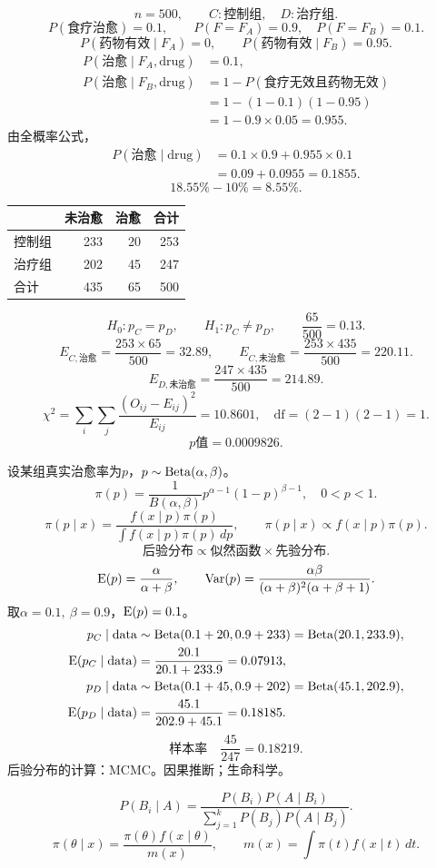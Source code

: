 \[
n=500,\qquad C:\text{控制组},\quad D:\text{治疗组}.
\]
\[
P(\text{食疗治愈})=0.1,\qquad
P(F=F_A)=0.9,\quad P(F=F_B)=0.1.
\]
\[
P(\text{药物有效}\mid F_A)=0,\qquad
P(\text{药物有效}\mid F_B)=0.95.
\]
\begin{align*}
P(\text{治愈}\mid F_A,\mathrm{drug})&=0.1,\\
P(\text{治愈}\mid F_B,\mathrm{drug})
&=1-P(\text{食疗无效且药物无效})\\
&=1-(1-0.1)(1-0.95)\\
&=1-0.9\times0.05=0.955.
\end{align*}
由全概率公式，
\begin{align*}
P(\text{治愈}\mid\mathrm{drug})
&=0.1\times0.9+0.955\times0.1\\
&=0.09+0.0955=0.1855.
\end{align*}
\[
18.55\%-10\%=8.55\%.
\]

\begin{center}
\begin{tabular}{lrrr}\toprule
 &未治愈&治愈&合计\\\midrule
控制组&233&20&253\\
治疗组&202&45&247\\\midrule
合计&435&65&500\\\bottomrule
\end{tabular}
\end{center}
\[
H_0:p_C=p_D,\qquad H_1:p_C\ne p_D,\qquad
\frac{65}{500}=0.13.
\]
\[
E_{C,\text{治愈}}=\frac{253\times65}{500}=32.89,\qquad
E_{C,\text{未治愈}}=\frac{253\times435}{500}=220.11.
\]
\[
E_{D,\text{未治愈}}=\frac{247\times435}{500}=214.89.
\]
\[
\chi^2=\sum_i\sum_j\frac{(O_{ij}-E_{ij})^2}{E_{ij}}
=10.8601,\quad
\mathrm{df}=(2-1)(2-1)=1.
\]
\[
p\text{值}=0.0009826.
\]

设某组真实治愈率为$p$，$p\sim\operatorname{Beta}(\alpha,\beta)$。
\[
\pi(p)=\frac{1}{B(\alpha,\beta)}p^{\alpha-1}(1-p)^{\beta-1},
\quad 0<p<1.
\]
\[
\pi(p\mid x)=
\frac{f(x\mid p)\pi(p)}{\int f(x\mid p)\pi(p)\,dp},
\qquad
\pi(p\mid x)\propto f(x\mid p)\pi(p).
\]
\[
\text{后验分布}\propto\text{似然函数}\times\text{先验分布}.
\]
\[
\operatorname{E}(p)=\frac{\alpha}{\alpha+\beta},\qquad
\operatorname{Var}(p)=\frac{\alpha\beta}{(\alpha+\beta)^2(\alpha+\beta+1)}.
\]
取$\alpha=0.1,\ \beta=0.9$，$\operatorname{E}(p)=0.1$。
\begin{align*}
p_C\mid\mathrm{data}
&\sim\operatorname{Beta}(0.1+20,0.9+233)=\operatorname{Beta}(20.1,233.9),\\
\operatorname{E}(p_C\mid\mathrm{data})
&=\frac{20.1}{20.1+233.9}=0.07913,\\
p_D\mid\mathrm{data}
&\sim\operatorname{Beta}(0.1+45,0.9+202)=\operatorname{Beta}(45.1,202.9),\\
\operatorname{E}(p_D\mid\mathrm{data})
&=\frac{45.1}{202.9+45.1}=0.18185.
\end{align*}
\[
\text{样本率}\quad \frac{45}{247}=0.18219.
\]
后验分布的计算：MCMC。因果推断；生命科学。

\[
P(B_i\mid A)=
\frac{P(B_i)P(A\mid B_i)}
{\sum_{j=1}^{k}P(B_j)P(A\mid B_j)}.
\]
\[
\pi(\theta\mid x)=
\frac{\pi(\theta)f(x\mid\theta)}{m(x)},\qquad
m(x)=\int \pi(t)f(x\mid t)\,dt.
\]
